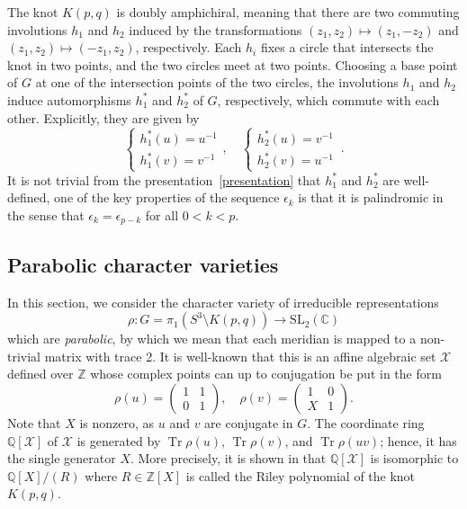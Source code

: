\documentclass{amsart}
\newcommand{\Q}{\mathbb{Q}}
\newcommand{\Z}{\mathbb{Z}}
\newcommand{\C}{\mathbb{C}}
\newcommand{\SL}{\mathrm{SL}}
\newcommand{\calX}{\mathcal{X}}
\DeclareMathOperator{\Tr}{Tr}
\theoremstyle{definition}
\begin{document}
The knot $K(p,q)$ is doubly amphichiral, meaning that there are two commuting involutions $h_1$ and $h_2$ induced by the transformations $(z_1,z_2)\mapsto(z_1,-z_2)$ and $(z_1,z_2)\mapsto (-z_1,z_2)$, respectively. Each $h_i$ fixes a circle that intersects the knot in two points, and the two circles meet at two points. Choosing a base point of $G$ at one of the intersection points of the two circles, the involutions $h_1$ and $h_2$ induce automorphisms $h_1^\ast$ and $h_2^\ast$ of $G$, respectively, which commute with each other.
Explicitly, they are given by
\begin{equation}
\label{eqn.h12}
    \left\{
    \begin{array}{l}
         h_1^\ast(u) = u^{-1} \\[2pt]
         h_1^\ast(v) = v^{-1}
    \end{array}
    \right. , \quad 
    \left\{
    \begin{array}{l}
         h_2^\ast(u) = v^{-1} \\[2pt]
         h_2^\ast(v) = u^{-1}
    \end{array}
    \right. \, .
\end{equation}
It is not trivial from the presentation~\eqref{presentation} that $h^\ast_1$ and $h^\ast_2$ are well-defined, one of the key properties of the sequence $\epsilon_k$ is that it is palindromic in the sense that $\epsilon_k=\epsilon_{p-k}$ for all $0<k<p$. 

\subsection{Parabolic character varieties}
\label{sec.para}

In this section, we consider the character variety of irreducible representations 
\begin{equation*}
    \rho:G = \pi_1(S^3\setminus K(p,q))\to \SL_2(\C)
\end{equation*}
which are \emph{parabolic}, by which we mean that each meridian is mapped to a non-trivial matrix with trace 2. It is well-known that this is an affine algebraic set $\calX$ defined over $\Z$ whose complex points can up to conjugation be put in the form 
$$\rho(u)=\begin{pmatrix} 1 & 1 \\ 0 & 1\end{pmatrix},\quad \rho(v)=\begin{pmatrix} 1 & 0 \\ X & 1\end{pmatrix}.$$
Note that $X$ is nonzero, as $u$ and $v$ are conjugate in $G$. The coordinate ring $\Q[\calX]$ of $\calX$ is generated by $\Tr \rho(u)$, $\Tr \rho(v)$, and $\Tr \rho(uv)$; hence, it has the single generator $X$. More precisely, it is shown in \cite{Riley} that
$\Q[\calX]$ is isomorphic to $\Q[X]/ (R)$
where $R \in \Z[X]$ is called the Riley polynomial of the knot $K(p,q)$.
\end{document}
